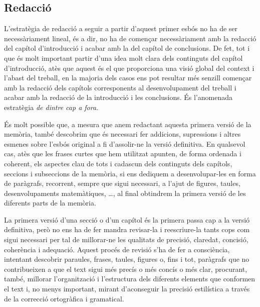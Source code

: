 \subsection{Redacció} L'estratègia de redacció a seguir a partir d'aquest primer esbós no ha de ser necessàriament lineal, és a dir, no ha de començar necessàriament amb la redacció del capítol d'introducció i acabar amb la del capítol de conclusions. De fet, tot i que és molt important partir d'una idea molt clara dels continguts del capítol d'introducció, atès que aquest és el que proporciona una visió global del context i l'abast del treball, en la majoria dels casos ens pot resultar més senzill començar amb la redacció dels capítols corresponents al desenvolupament del treball i acabar amb la redacció de la introducció i les conclusions. És l'anomenada estratègia \emph{de dintre cap a fora}.

És molt possible que, a mesura que anem redactant aquesta primera versió de la memòria, també descobrim que és necessari fer addicions, supressions i altres esmenes sobre l'esbós original a fi d'assolir-ne la versió definitiva. En qualsevol cas, atès que les frases curtes que hem utilitzat apunten, de forma ordenada i coherent, els aspectes clau de tots i cadascun dels continguts dels capítols, seccions i subseccions de la memòria, si ens dediquem a desenvolupar-les en forma de paràgrafs, recorrent, sempre que sigui necessari, a l'ajut de figures, taules, desenvolupaments matemàtiques, \ldots, al final obtindrem la primera versió de les diferents parts de la memòria.

La primera versió d'una secció o d'un capítol és la primera passa cap a la versió definitiva, però no ens ha de fer mandra revisar-la i reescriure-la tants cops com sigui necessari per tal de millorar-ne les qualitats de precisió, claredat, concisió, coherència i adequació. Aquest procés de revisió s'ha de fer a consciència, intentant descobrir paraules, frases, taules, figures o, fins i tot, paràgrafs que no contribueixen a que el text sigui més precís o més concís o més clar, procurant, també, millorar l'organització i l'estructura dels diferents elements que conformen el text i, no menys important, mirant d'aconseguir la precisió estilística a través de la correcció ortogràfica i gramatical.

